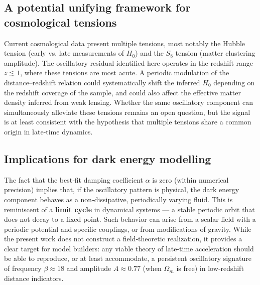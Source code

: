 \documentclass[10pt,a4paper,twocolumn]{article}
\begin{document}
\subsection{A potential unifying framework for cosmological tensions}
Current cosmological data present multiple tensions, most notably the Hubble tension (early vs. late measurements of $H_0$) and the $S_8$ tension (matter clustering amplitude). The oscillatory residual identified here operates in the redshift range $z\lesssim1$, where these tensions are most acute. A periodic modulation of the distance–redshift relation could systematically shift the inferred $H_0$ depending on the redshift coverage of the sample, and could also affect the effective matter density inferred from weak lensing. Whether the same oscillatory component can simultaneously alleviate these tensions remains an open question, but the signal is at least consistent with the hypothesis that multiple tensions share a common origin in late‑time dynamics.

\subsection{Implications for dark energy modelling}
The fact that the best‑fit damping coefficient $\alpha$ is zero (within numerical precision) implies that, if the oscillatory pattern is physical, the dark energy component behaves as a non‑dissipative, periodically varying fluid. This is reminiscent of a \textbf{limit cycle} in dynamical systems — a stable periodic orbit that does not decay to a fixed point. Such behavior can arise from a scalar field with a periodic potential and specific couplings, or from modifications of gravity. While the present work does not construct a field‑theoretic realization, it provides a clear target for model builders: any viable theory of late‑time acceleration should be able to reproduce, or at least accommodate, a persistent oscillatory signature of frequency $\beta\approx18$ and amplitude $A\approx0.77$ (when $\Omega_m$ is free) in low‑redshift distance indicators.
\end{document}
